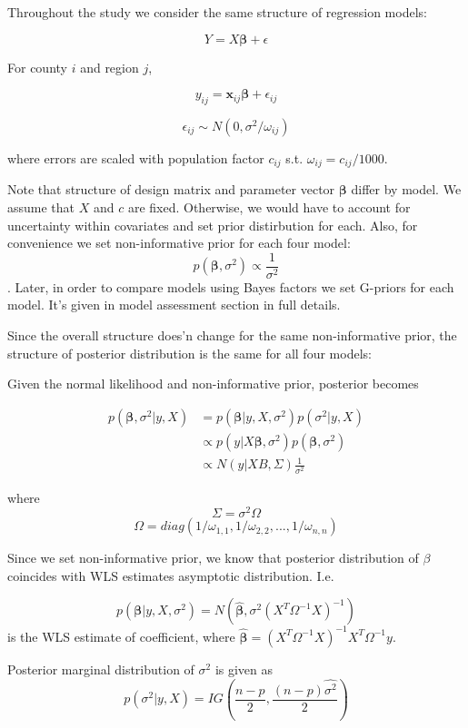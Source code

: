 \documentclass[11pt,twocolumn]{asaproc}
\begin{document}
Throughout the study we consider the same structure of regression models:

$$Y = X \pmb{\beta}  + \epsilon$$ 

For county $i$ and region $j$, 

$$y_{ij} = \mathbf{x}_{ij}\pmb{\beta}  + \epsilon_{ij}$$

$$\epsilon_{ij} \sim N(0, \sigma^2  / \omega_{ij})$$

where errors are scaled with population factor $c_{ij}$ s.t. $\omega_{ij} = c_{ij} / 1000$. 

Note that structure of design matrix and parameter vector $\pmb{\beta} $ differ by model. We assume that $X$ and $c$ are fixed. Otherwise, we would have to account for uncertainty within covariates and set prior distirbution for each. Also, for convenience we set non-informative prior for each four model: $$ p(\pmb{\beta} , \sigma^2) \propto \frac{1}{\sigma^2}$$. Later, in order to compare models using Bayes factors we set G-priors for each model. It's given in model assessment section in full details. 

Since the overall structure does'n change for the same non-informative prior, the structure of posterior distribution is the same for all four models:

Given the normal likelihood and non-informative prior, posterior becomes 

\begin{align*}
p(\pmb{\beta}, \sigma^2 | y, X) & = p(\pmb{\beta} | y, X, \sigma^2) p(\sigma^2 | y, X) \\
& \propto p(y | X\pmb{\beta}, \sigma^2) p(\pmb{\beta}, \sigma^2) \\
&\propto N(y | XB, \Sigma) \frac{1}{\sigma^2}
\end{align*}
 
 where $$\Sigma = \sigma^2 \Omega$$ $$\Omega = diag(1/\omega_{1,1}, 1/\omega_{2,2}, ..., 1/\omega_{n,n})$$
 
 Since we set non-informative prior, we know that posterior distribution of $\beta$ coincides with WLS estimates asymptotic distribution. I.e. 
 
 $$p(\pmb{\beta}| y, X, \sigma^2)  = N(\hat{\pmb{\beta}}, \sigma^2(X^{T}\Omega^{-1}X)^{-1})$$ is the WLS estimate of coefficient, where $\hat{\pmb{\beta}} = (X^T \Omega^{-1}X)^{-1} X^T  \Omega^{-1} y$. 
 
 Posterior marginal distribution of $\sigma^2$ is given as 
  $$p(\sigma^2 | y, X)  = IG (\frac{n-p}{2}, \frac{(n-p)\hat{\sigma^2}}{2})$$
\end{document}
